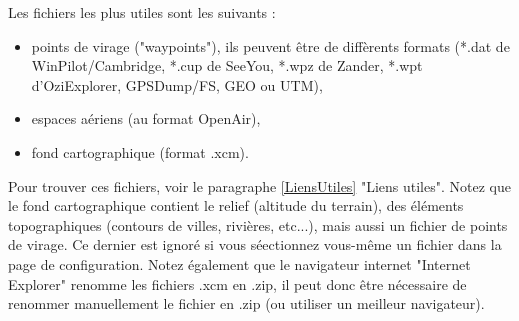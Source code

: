 \documentclass{article}
\begin{document}
Les fichiers les plus utiles sont les suivants :
\begin{itemize}
\item points de virage ("waypoints"), ils peuvent être de diffèrents formats (*.dat de WinPilot/Cambridge, *.cup de SeeYou, *.wpz de Zander, *.wpt d'OziExplorer, GPSDump/FS, GEO ou UTM),
\item espaces aériens (au format OpenAir),
\item fond cartographique (format .xcm).\\
\end{itemize}
%
Pour trouver ces fichiers, voir le paragraphe \ref{LiensUtiles} "Liens utiles". Notez que le fond cartographique contient le relief (altitude du terrain), des éléments topographiques (contours de villes, rivières, etc...), mais aussi un fichier de points de virage. Ce dernier est ignoré si vous séectionnez vous-même un fichier dans la page de configuration. Notez également que le navigateur internet "Internet Explorer" renomme les fichiers .xcm en .zip, il peut donc être nécessaire de renommer manuellement le fichier en .zip (ou utiliser un meilleur navigateur).
%
\end{document}
